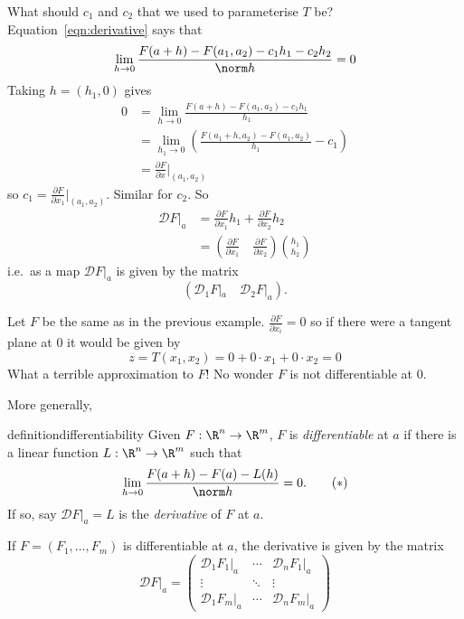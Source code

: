 \documentclass[a4paper]{article}
\newcommand*{\D}{\mathcal{D}}
\theoremstyle{definition}
\begin{document}
What should \(c_1\) and \(c_2\) that we used to parameterise \(T\) be? Equation~\eqref{eqn:derivative} says that
\[
  \lim_{h \to 0} \frac{F(a + h) - F(a_1, a_2) - c_1h_1 - c_2h_2}{\norm h} = 0
\]
Taking \(h = (h_1, 0)\) gives
\begin{align*}
  0 &= \lim_{h \to 0} \frac{F(a + h) - F(a_1, a_2) - c_1h_1}{h_1} \\
    &= \lim_{h_1 \to 0} \left( \frac{F(a_1 + h, a_2) - F(a_1, a_2)}{h_1} - c_1 \right) \\
    &= \frac{\partial F}{\partial x} \Big|_{(a_1, a_2)}
\end{align*}
so \(c_1 = \frac{\partial F}{\partial x_1}|_{(a_1, a_2)}\). Similar for \(c_2\). So
\begin{align*}
    \D F|_a &= \frac{\partial F}{\partial x_1} h_1 + \frac{\partial F}{\partial x_2} h_2 \\
            &= \left( \frac{\partial F}{\partial x_1} \quad \frac{\partial F}{\partial x_2} \right) \binom{h_1}{h_2}
\end{align*}
i.e.\ as a map \(\D F|_a\) is given by the matrix
\[
  (\D_1 F|_a \quad \D_2 F|_a ).
\]

\begin{eg}
  Let \(F\) be the same as in the previous example. \(\frac{\partial F}{\partial x_i} = 0\) so if there were a tangent plane at 0 it would be given by
  \[
    z = T(x_1, x_2) = 0 + 0 \cdot x_1 + 0 \cdot x_2 = 0
  \]
  What a terrible approximation to \(F\)! No wonder \(F\) is not differentiable at \(0\).
\end{eg}

More generally,

\begin{restatable}[Differentiability]{definition}{differentiability}
  Given \(F: \R^n \to \R^m\), \(F\) is \emph{differentiable} at \(a\) if there is a linear function \(L: \R^n \to \R^m\) such that
  \begin{equation}
    \label{eqn:derivative2}
    \lim_{h \to 0} \frac{F(a + h) - F(a) - L(h)}{\norm h} = 0.
    \tag{\(\ast\)}
  \end{equation}
  If so, say \(\D F|_a = L\) is the \emph{derivative} of \(F\) at \(a\).
\end{restatable}

If \(F = (F_1, \dots, F_m)\) is differentiable at \(a\), the derivative is given by the matrix
\[
  \D F|_a =
  \begin{pmatrix}
    \D_1F_1|_a & \cdots & \D_nF_1|_a \\
    \vdots & \ddots & \vdots \\
    \D_1F_m|_a & \cdots & \D_nF_m|_a
  \end{pmatrix}
\]
  
\end{document}
